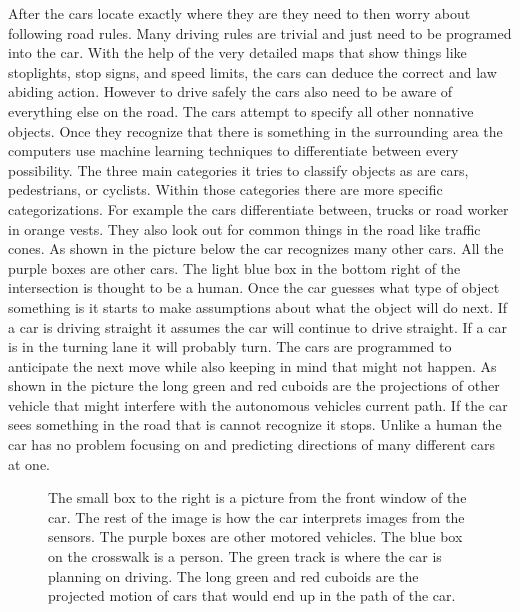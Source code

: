 \documentclass[11pt]{article}
\begin{document}
After the cars locate exactly where they are they need to then worry about following road rules. Many driving rules are trivial and just need to be programed
into the car. With the help of the very detailed maps that show things like stoplights, stop signs, and speed limits, the cars can deduce the correct and
law abiding action. However to drive safely the cars also need to be aware of everything else on the road. The cars attempt to specify all other nonnative
objects. Once they recognize that there is something in the surrounding area the computers use machine learning techniques to
differentiate between every possibility. \cite{zhu2012object} The three main categories it tries to classify objects as are cars, pedestrians, or cyclists.
Within those categories there are more specific categorizations. For example the cars differentiate between, trucks or
road worker in orange vests. \cite{zhu2012object} They also look out for common things in the road like traffic cones. As shown in the picture below the car recognizes many other cars. All the purple boxes are other cars. The light
blue box in the bottom right of the intersection is thought to be a human. Once the car guesses what type of object something is it starts to make assumptions
about what the object will do next. If a car is driving straight it assumes the car will continue to drive straight. If
a car is in the turning lane it will probably turn. The cars are programmed to anticipate the next move while also
keeping in mind that might not happen. \cite{crisurmson2016} As shown in the picture the long green and red cuboids are the projections of other vehicle that might interfere with
the autonomous vehicles current path. If the car sees something in the road that is cannot recognize it stops. Unlike a human the car has no problem focusing on and predicting directions of many different cars at one.  
\begin{figure}[!ht]
  \centering
                  \caption{The small box to the right is a picture from the front window of the car. The rest of the
                      image is how the car interprets images from the sensors. The purple boxes are other motored
                          vehicles. The blue box on the crosswalk is a person. The green track is where the car is planning on driving.
                           The long green and red cuboids are the projected motion of cars that would end up in the
                  path of the car. \cite{chrisurmson2016}}
\end{figure}
\end{document}
